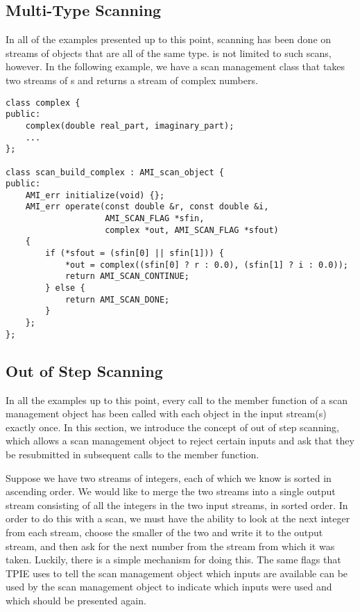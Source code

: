 \subsection{Multi-Type Scanning}


In all of the examples presented up to this point, scanning has been
done on streams of objects that are all of the same type.
 is not limited to such scans, however.  In the
following example, we have a scan management class that takes two
streams of s and returns a stream of complex numbers.

\begin{verbatim}
class complex {
public:
    complex(double real_part, imaginary_part);
    ...
};

class scan_build_complex : AMI_scan_object {
public:
    AMI_err initialize(void) {};
    AMI_err operate(const double &r, const double &i, 
                    AMI_SCAN_FLAG *sfin,
                    complex *out, AMI_SCAN_FLAG *sfout)
    {
        if (*sfout = (sfin[0] || sfin[1])) {
            *out = complex((sfin[0] ? r : 0.0), (sfin[1] ? i : 0.0));
            return AMI_SCAN_CONTINUE;
        } else {
            return AMI_SCAN_DONE;
        }   
    };
};
\end{verbatim}

\subsection{Out of Step Scanning}
\label{sec:out-of-step}

In all the examples up to this point, every call to the
 member function of a scan management object has been
called with each object in the input stream(s) exactly once.  In this
section, we introduce the concept of out of step scanning, which
allows a scan management object to reject certain inputs and ask that
they be resubmitted in subsequent calls to the  member
function.

Suppose we have two streams of integers, each of which we know is
sorted in ascending order.  We would like to merge the two streams
into a single output stream consisting of all the integers in the two
input streams, in sorted order.  In order to do this with a scan, we
must have the ability to look at the next integer from each stream,
choose the smaller of the two and write it to the output stream, and
then ask for the next number from the stream from which it was taken.
Luckily, there is a simple mechanism for doing this.  The same flags
that TPIE uses to tell the scan management object which inputs are
available can be used by the scan management object to indicate which
inputs were used and which should be presented again.

